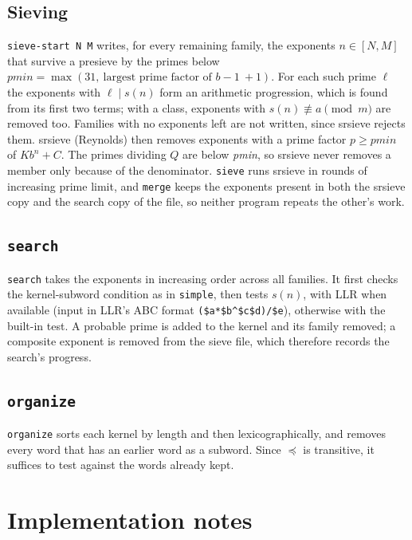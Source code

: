 \documentclass[11pt]{article}
\theoremstyle{definition}
\theoremstyle{remark}
\newcommand{\code}[1]{\texttt{#1}}
\newcommand{\sw}{\preceq}   %
\begin{document}
\subsection{Sieving}
\code{sieve-start N M} writes, for every remaining family, the exponents $n\in[N,M]$ that survive a presieve by the primes below $\textit{pmin}=\max(31,\ \text{largest prime factor of } b-1 \ +1)$. For each such prime $\ell$ the exponents with $\ell\mid s(n)$ form an arithmetic progression, which is found from its first two terms; with a class, exponents with $s(n)\not\equiv a\pmod m$ are removed too. Families with no exponents left are not written, since srsieve rejects them. srsieve (Reynolds) then removes exponents with a prime factor $p\ge\textit{pmin}$ of $K b^n+C$. The primes dividing $Q$ are below \textit{pmin}, so srsieve never removes a member only because of the denominator. \code{sieve} runs srsieve in rounds of increasing prime limit, and \code{merge} keeps the exponents present in both the srsieve copy and the search copy of the file, so neither program repeats the other's work.

\subsection{\code{search}}
\code{search} takes the exponents in increasing order across all families. It first checks the kernel-subword condition as in \code{simple}, then tests $s(n)$, with LLR when available (input in LLR's ABC format \code{(\$a*\$b\^{}\$c\$d)/\$e}), otherwise with the built-in test. A probable prime is added to the kernel and its family removed; a composite exponent is removed from the sieve file, which therefore records the search's progress.

\subsection{\code{organize}}
\code{organize} sorts each kernel by length and then lexicographically, and removes every word that has an earlier word as a subword. Since $\sw$ is transitive, it suffices to test against the words already kept.

\section{Implementation notes}
\end{document}
